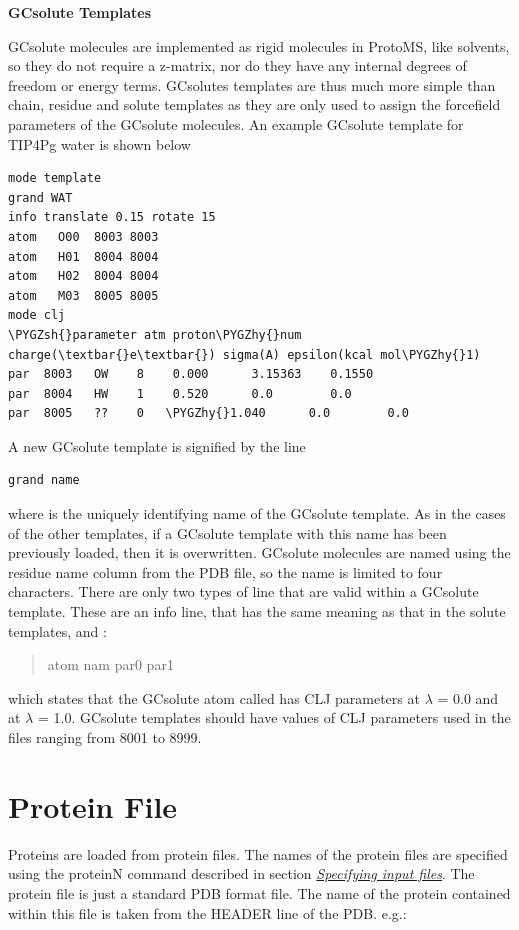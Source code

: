 \documentclass[letterpaper,10pt,english]{sphinxmanual}
\def\PYGZsh{\char`\#}
\def\PYGZhy{\char`\-}
\begin{document}
\textbf{GCsolute Templates}

GCsolute molecules are implemented as rigid molecules in ProtoMS, like solvents, so they do not require a z-matrix, nor do they have any internal degrees of freedom or energy terms. GCsolutes templates are thus much more simple than chain, residue and solute templates as they are only used to assign the forcefield parameters of the GCsolute molecules. An example GCsolute template for TIP4Pg water is shown below

\begin{Verbatim}[commandchars=\\\{\}]
mode template
grand WAT
info translate 0.15 rotate 15
atom   O00  8003 8003
atom   H01  8004 8004
atom   H02  8004 8004
atom   M03  8005 8005
mode clj
\PYGZsh{}parameter atm proton\PYGZhy{}num charge(\textbar{}e\textbar{}) sigma(A) epsilon(kcal mol\PYGZhy{}1)
par  8003   OW    8    0.000      3.15363    0.1550
par  8004   HW    1    0.520      0.0        0.0
par  8005   ??    0   \PYGZhy{}1.040      0.0        0.0
\end{Verbatim}

A new GCsolute template is signified by the line

\begin{Verbatim}[commandchars=\\\{\}]
grand name
\end{Verbatim}

where  is the uniquely identifying name of the GCsolute template. As in the cases of the other templates, if a GCsolute template with this name has been previously loaded, then it is overwritten. GCsolute molecules are named using the residue name column from the PDB file, so the name is limited to four characters. There are only two types of line that are valid within a GCsolute template. These are an info line, that has the same meaning as that in the solute templates, and :
\begin{quote}

atom nam par0 par1
\end{quote}

which states that the GCsolute atom called  has CLJ parameters  at \(\lambda\)  = 0.0 and  at \(\lambda\) = 1.0. GCsolute templates should have values of CLJ parameters used in the files ranging from 8001 to 8999.


\section{Protein File}
\label{protoms:protein-file}\label{protoms:protpdb}
Proteins are loaded from protein files. The names of the protein files are specified using the proteinN command described in section {\hyperref[protoms:incmd]{\emph{Specifying input files}}}. The protein file is just a standard PDB format file. The name of the protein contained within this file is taken from the HEADER line of the PDB. e.g.:
\end{document}
